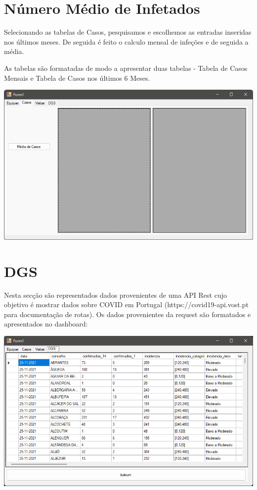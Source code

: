 \section{Número Médio de Infetados}

Selecionando as tabelas de Casos, pesquisamos e escolhemos as entradas inseridas nos últimos meses.
De seguida é feito o calculo mensal de infeções e de seguida a média.

As tabelas são formatadas de modo a apresentar duas tabelas - Tabela de Casos Mensais e Tabela de Casos nos últimos 6 Meses.

\includegraphics[scale=0.65]{imagens/CasosDashboard.png}
\vfill
\section{DGS}

Nesta secção são representados dados provenientes de uma API Rest cujo objetivo é mostrar dados sobre COVID em Portugal (https://covid19-api.vost.pt para documentação de rotas).
Os dados provenientes da request são formatados e apresentados no dashboard:

\includegraphics[scale=0.65]{imagens/DGSDashboard.png}